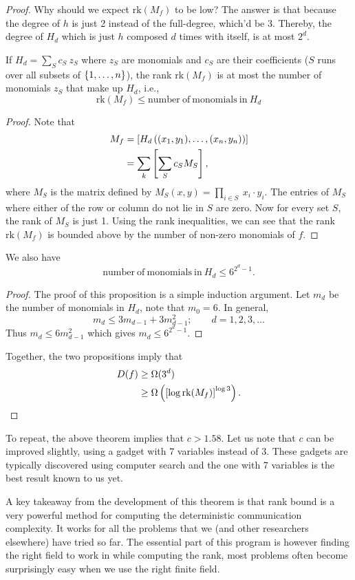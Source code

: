 \documentclass[letterpaper]{article}
\providecommand\rbrac[1]{\ensuremath \left(#1\right)}
\providecommand\sqbrac[1]{\ensuremath \left[#1\right]}
\providecommand\cbrac[1]{\ensuremath \left\{#1\right\}}
\newcommand{\rk}{\mathrm{rk}}
\newcommand{\mf}{M_f}
\newcommand{\df}{D(f)}
\begin{document}
\begin{proof}
Why should we expect $\rk (\mf)$ to be low? The answer is that because the degree of $h$ is just 2 instead of the full-degree, which'd be 3. Thereby, the degree of $H_d$ which is just $h$ composed $d$ times with itself, is at most $2^d$.

\begin{proposition}
If $H_d = \sum_S c_S\ z_S$ where $z_S$ are monomials and $c_S$ are their coefficients ($S$ runs over all subsets of $\cbrac{1, \ldots, n}$), the rank $\rk (\mf)$ is at most the number of monomials $z_S$ that make up $H_d$, i.e.,
$$
\rk (\mf) \leq \mathrm{number\ of\ monomials\ in}\ H_d
$$
\end{proposition}
\begin{proof}
Note that
\begin{align*}
    \mf &= \sqbrac{H_d \rbrac{(x_1, y_1), \ldots, (x_n, y_n)}}\\
    &= \sum_k \sqbrac{\sum_S c_S M_S},
\end{align*}
where $M_S$ is the matrix defined by $M_S(x,y) = \prod_{i \in S}\ x_i \cdot y_i$. The entries of $M_S$ where either of the row or column do not lie in $S$ are zero. Now for every set $S$, the rank of $M_S$ is just 1. Using the rank inequalities, we can see that the rank $\rk (\mf)$ is bounded above by the number of non-zero monomials of $f$.
\end{proof}

\begin{proposition}
We also have 
$$
\mathrm{number\ of\ monomials\ in}\ H_d \leq 6^{2^d -1}.
$$
\end{proposition}
\begin{proof}
The proof of this proposition is a simple induction argument. Let $m_d$ be the number of monomials in $H_d$, note that $m_0 = 6$. In general,
$$
m_d \leq 3 m_{d-1} + 3 m_{d-1}^2; \qquad d = 1, 2, 3, \ldots
$$
Thus $m_d \leq 6 m_{d-1}^2$ which gives $m_d \leq 6^{2^d - 1}$.
\end{proof}

Together, the two propositions imply that
\begin{align*}
\df &\geq \Omega(3^d)\\
& \geq \Omega \rbrac{\sqbrac{\log \rk (\mf)}^{\log 3} }.
\end{align*}
\end{proof}

\begin{remark}
To repeat, the above theorem implies that $c > 1.58$. Let us note that $c$ can be improved slightly, using a gadget with 7 variables instead of 3. These gadgets are typically discovered using computer search and the one with 7 variables is the best result known to us yet.

A key takeaway from the development of this theorem is that rank bound is a very powerful method for computing the deterministic communication complexity. It works for all the problems that we (and other researchers elsewhere) have tried so far. The essential part of this program is however finding the right field to work in while computing the rank, most problems often become surprisingly easy when we use the right finite field.
\end{remark}
\end{document}
